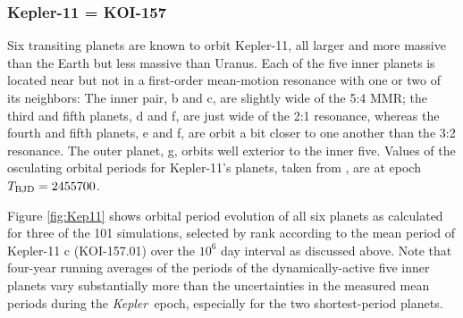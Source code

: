 \documentclass{aastex62}
\newcommand{\ik}{{\it Kepler~}}
\begin{document}
\subsubsection{Kepler-11 = KOI-157}

Six transiting planets are known to orbit Kepler-11, all larger and more massive than the Earth but less massive than Uranus. Each of the five inner planets is located near but not in a first-order mean-motion resonance with one or two of its neighbors: The inner pair, b and c, are slightly wide of the 5:4 MMR; the third and fifth planets, d and f, are just wide of the 2:1 resonance, whereas the fourth and fifth planets, e and f, are orbit a bit closer to one another than the 3:2 resonance. The outer planet, g, orbits well exterior to the inner five. Values of the osculating orbital periods for Kepler-11's planets, taken from \cite{Bedell:2017}, are at epoch $T_{\rm BJD} = 2455700$.

Figure \ref{fig:Kep11} shows orbital period evolution of all six planets as calculated for three of the 101 simulations, selected by rank according to the mean period of Kepler-11 c (KOI-157.01) over the $10^6$ day interval as discussed above.   Note that four-year running averages of the periods of the dynamically-active five inner planets vary substantially more than the uncertainties in the measured mean periods during the \ik epoch, especially for the two shortest-period planets.
\end{document}

